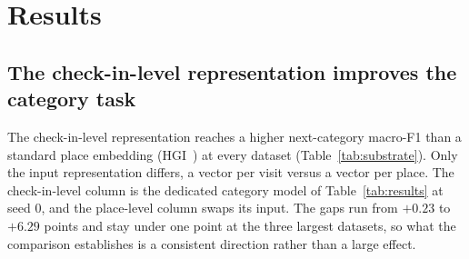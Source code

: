 %
%
\section{Results}
\label{sec:results}

\subsection{The check-in-level representation improves the category task}
\label{sec:results-part1}
The check-in-level representation reaches a higher next-category macro-F1 than a standard place
embedding (HGI~\cite{huang2023hgi}) at every dataset
(Table~\ref{tab:substrate}). Only the input representation differs, a vector per visit versus a vector per place. The check-in-level column is the dedicated category model of Table~\ref{tab:results} at seed 0, and the place-level column swaps its input.
The gaps run from $+0.23$ to $+6.29$ points and stay under one point at the three largest
datasets, so what the comparison establishes is a consistent direction rather than a large effect.


